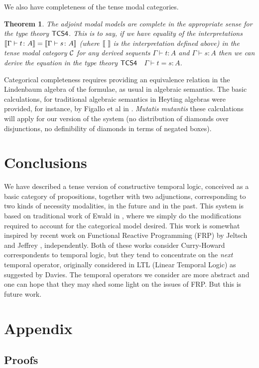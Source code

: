 \documentclass{article}
\def\sem#1{[\hspace{-0.05cm}[#1]\hspace{-0.05cm}]}
\newtheorem{theorem}{Theorem}
\begin{document}
We also have completeness of the tense modal categories.

\begin{theorem}
\label{thm:tcs4-completeness}
The adjoint modal models are \textit{complete} in the appropriate sense for the type theory $\sf{TCS4}$. This is to say, if
we have equality of the interpretations $\sem{\Gamma \vdash t \colon A} = \sem{\Gamma  \vdash s \colon A}$
 (where \mbox{$\sem{\ } $} is the interpretation defined above)
 in the
tense modal category $\cal C$
   for any derived sequents $\Gamma \vdash t \colon A$
 and $\Gamma \vdash s \colon A$ 
 then we can derive the  equation in the type theory $\sf{TCS4}$ $\;$
 $\Gamma \vdash t = s \colon A$. 
\end{theorem}
Categorical completeness requires providing an equivalence relation in the Lindenbaum algebra of the formulae, as usual in algebraic semantics. The basic calculations, for traditional algebraic semantics in Heyting algebras were provided, for instance, by Figallo et al in \cite{figallo2014}. \textit{Mutatis mutantis} these calculations will apply for our version of the system (no distribution of diamonds over disjunctions, no definibility of diamonds in terms of negated boxes).

\section{Conclusions}
We have described a tense version of constructive temporal logic, conceived as a basic category of propositions, together with two adjunctions, corresponding to two kinds of  necessity 
modalities, in the future and in the past. This system is based on traditional work of Ewald in \cite{ewald1986}, where we simply do the modifications required to account for the  categorical model desired. This work is somewhat inspired by recent work on Functional Reactive Programming (FRP) by Jeltsch \cite{jeltsch2012} and Jeffrey \cite{jeffrey2012}, independently. Both of these works consider Curry-Howard correspondents to temporal logic, but they tend to concentrate on the \textit{next} temporal operator, originally considered in LTL (Linear Temporal Logic) as suggested by Davies. The temporal operators we consider are more abstract and one can hope that they may shed some light on the issues of FRP. But this is future work.




\appendix

\section{Appendix}
\label{sec:appendix}

\subsection{Proofs}
\label{subsec:proofs}


\end{document}
